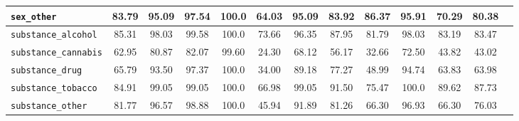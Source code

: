 \begin{table}[h!]
{\begin{tabular}{l|c|ccccccccccc}
\texttt{sex\_other} &\colorbox{Red!30}{83.79} & \colorbox{Orange!50}{95.09} & \colorbox{Orange!50}{97.54} & \colorbox{Sand!20}{100.0} & \colorbox{Red!30}{64.03} & \colorbox{Orange!50}{95.09} & \colorbox{Red!30}{83.92} & \colorbox{Red!30}{86.37} & \colorbox{Orange!50}{95.91} & \colorbox{Red!30}{70.29} & \colorbox{Red!30}{80.38}\\

\midrule
\texttt{substance\_alcohol} &\colorbox{Red!30}{85.31} & \colorbox{Orange!50}{98.03} & \colorbox{Sand!20}{99.58} & \colorbox{Sand!20}{100.0} & \colorbox{Red!30}{73.66} & \colorbox{Orange!50}{96.35} & \colorbox{Red!30}{87.95} & \colorbox{Red!30}{81.79} & \colorbox{Orange!50}{98.03} & \colorbox{Red!30}{83.19} & \colorbox{Red!30}{83.47}\\

\texttt{substance\_cannabis} &\colorbox{Red!30}{62.95} & \colorbox{Red!30}{80.87} & \colorbox{Red!30}{82.07} & \colorbox{Sand!20}{99.60} & \colorbox{Red!30}{24.30} & \colorbox{Red!30}{68.12} & \colorbox{Red!30}{56.17} & \colorbox{Red!30}{32.66} & \colorbox{Red!30}{72.50} & \colorbox{Red!30}{43.82} & \colorbox{Red!30}{43.02}\\

\texttt{substance\_drug} &\colorbox{Red!30}{65.79} & \colorbox{Orange!50}{93.50} & \colorbox{Orange!50}{97.37} & \colorbox{Sand!20}{100.0} & \colorbox{Red!30}{34.00} & \colorbox{Red!30}{89.18} & \colorbox{Red!30}{77.27} & \colorbox{Red!30}{48.99} & \colorbox{Orange!50}{94.74} & \colorbox{Red!30}{63.83} & \colorbox{Red!30}{63.98}\\

\texttt{substance\_tobacco} &\colorbox{Red!30}{84.91} & \colorbox{Sand!20}{99.05} & \colorbox{Sand!20}{99.05} & \colorbox{Sand!20}{100.0} & \colorbox{Red!30}{66.98} & \colorbox{Sand!20}{99.05} & \colorbox{Orange!50}{91.50} & \colorbox{Red!30}{75.47} & \colorbox{Sand!20}{100.0} & \colorbox{Red!30}{89.62} & \colorbox{Red!30}{87.73}\\

\texttt{substance\_other}&\colorbox{Red!30}{81.77}  & \colorbox{Orange!50}{96.57} & \colorbox{Orange!50}{98.88} & \colorbox{Sand!20}{100.0} & \colorbox{Red!30}{45.94} & \colorbox{Orange!50}{91.89} & \colorbox{Red!30}{81.26} & \colorbox{Red!30}{66.30} & \colorbox{Orange!50}{96.93} & \colorbox{Red!30}{66.30} & \colorbox{Red!30}{76.03}\\


\end{tabular}}
\end{table}
